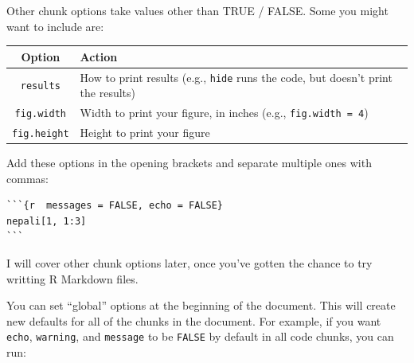 \documentclass[]{book}
\begin{document}
Other chunk options take values other than TRUE / FALSE. Some you might
want to include are:

\begin{longtable}[c]{@{}cl@{}}
\toprule
\begin{minipage}[b]{0.17\columnwidth}\centering\strut
Option
\strut\end{minipage} &
\begin{minipage}[b]{0.64\columnwidth}\raggedright\strut
Action
\strut\end{minipage}\tabularnewline
\midrule
\endhead
\begin{minipage}[t]{0.17\columnwidth}\centering\strut
\texttt{results}
\strut\end{minipage} &
\begin{minipage}[t]{0.64\columnwidth}\raggedright\strut
How to print results (e.g., \texttt{hide} runs the code, but doesn't
print the results)
\strut\end{minipage}\tabularnewline
\begin{minipage}[t]{0.17\columnwidth}\centering\strut
\texttt{fig.width}
\strut\end{minipage} &
\begin{minipage}[t]{0.64\columnwidth}\raggedright\strut
Width to print your figure, in inches (e.g., \texttt{fig.width\ =\ 4})
\strut\end{minipage}\tabularnewline
\begin{minipage}[t]{0.17\columnwidth}\centering\strut
\texttt{fig.height}
\strut\end{minipage} &
\begin{minipage}[t]{0.64\columnwidth}\raggedright\strut
Height to print your figure
\strut\end{minipage}\tabularnewline
\bottomrule
\end{longtable}

Add these options in the opening brackets and separate multiple ones
with commas:

\begin{verbatim}
```{r  messages = FALSE, echo = FALSE}
nepali[1, 1:3]
```
\end{verbatim}

I will cover other chunk options later, once you've gotten the chance to
try writting R Markdown files.

You can set ``global'' options at the beginning of the document. This
will create new defaults for all of the chunks in the document. For
example, if you want \texttt{echo}, \texttt{warning}, and
\texttt{message} to be \texttt{FALSE} by default in all code chunks, you
can run:
\end{document}
